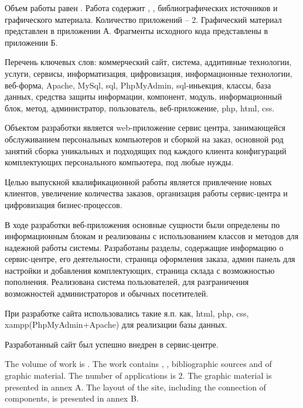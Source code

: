 
Объем работы равен . Работа содержит , ,  библиографических источников и  графического материала. Количество приложений – 2. Графический материал представлен в приложении А. Фрагменты исходного кода представлены в приложении Б.

Перечень ключевых слов: коммерческий сайт, система, аддитивные технологии, услуги, сервисы, информатизация, цифровизация, информационные технологии, веб-форма,  Apache, MySql, sql, PhpMyAdmin, sql-иньекция, классы, база данных, средства защиты информации, компонент, модуль, информационный блок, метод,  администратор, пользователь, веб-приложение, php, html, css.

Объектом разработки является web-приложение сервис центра,  занимающейся обслуживанием персональных компьютеров и сборкой на заказ, основной род занятий сборка уникальных и подходящих под каждого клиента конфигураций комплектующих персонального компьютера, под любые нужды.

Целью выпускной квалификационной работы является привлечение новых клиентов, увеличение количества заказов, организация работы сервис-центра и цифровизация бизнес-процессов.

В ходе разработки веб-приложения основные сущности были определены по информационным блокам и реализованы с использованием классов и методов для надежной работы системы. Разработаны разделы, содержащие информацию о сервис-центре, его деятельности, страница оформления заказа, админ панель для настройки и добавления комплектующих, страница склада с возможностью пополнения. Реализована система пользователей, для разграничения возможностей администраторов и обычных посетителей.

При разработке сайта использовались такие я.п. как, html, php, css, xampp(PhpMyAdmin+Apache) для реализации базы данных.

Разработанный сайт был успешно внедрен в сервис-центре.

  
The volume of work is . The work contains , ,  bibliographic sources and  of graphic material. The number of applications is 2. The graphic material is presented in annex A. The layout of the site, including the connection of components, is presented in annex B.


